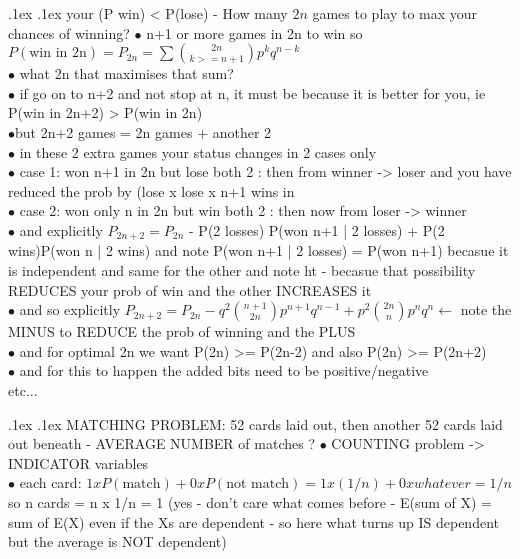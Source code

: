 \documentclass[10pt,landscape,a4paper]{article}
\makeatletter
\renewcommand{\section}{\@startsection{section}{1}{0mm}%
                                {.1ex}%
                                {.1ex}%
                                {\color{blue}\sffamily\small\bfseries}}
\makeatother
\begin{document}
\begin{multicols*}{3}
\begin{spacing}{0.1}
\section{your (P win) < P(lose) - How many $2n$ games to play to max your chances of winning? } 
$\bullet$ n+1 or more games in 2n to win so $ P(\text{win in 2n}) = P_{2n}=\sum \binom{2n}{k>= n+1} p^k q^{n-k}$\\
$\bullet$ what 2n that maximises that sum?\\
$\bullet$ if go on to n+2 and not stop at n, it must be because it is better for you, ie P(win in 2n+2) > P(win in 2n)\\
$\bullet$but 2n+2 games = 2n games + another 2\\
$\bullet$ in these 2 extra games your status changes in 2 cases only\\
$\bullet$ case 1: won n+1 in 2n but lose both 2 : then from winner ->  loser and you have reduced the prob by (lose x lose x n+1 wins in \\
$\bullet$ case 2: won only n in 2n but win both 2 : then now from loser -> winner\\
$\bullet$ and explicitly $P_{2n+2} = P_{2n} $ - P(2 losses) P(won n+1 | 2 losses) + P(2 wins)P(won n | 2 wins) and note P(won n+1 | 2 losses) = P(won n+1) becasue it is independent and same for the other and note ht - becasue that possibility REDUCES your prob of win and the other INCREASES it\\
$\bullet$ and so explicitly $P_{2n+2} = P_{2n} - q^2\binom{n+1}{2n}p^{n+1}q^{n-1} + p^2\binom{2n}{n}p^nq^n \longleftarrow$ note the MINUS to REDUCE the prob of winning and the PLUS \\
$\bullet$ and for optimal 2n we want P(2n) >= P(2n-2) and also P(2n) >= P(2n+2) \\
$\bullet$ and for this to happen the added bits need to be positive/negative\\
etc...

\section{MATCHING PROBLEM: 52 cards laid out, then another 52 cards laid out beneath - AVERAGE NUMBER of matches ?}
$\bullet$ COUNTING problem -> INDICATOR variables\\
$\bullet$ each card: $ 1 x P(\text{match}) + 0 x P(\text{not match}) = 1 x (1/n) + 0 x whatever = 1/n$ so n cards = n x 1/n = 1 (yes - don't care what comes before - E(sum of X) = sum of E(X) even if the Xs are dependent - so here what turns up IS dependent but the average is NOT dependent)


\end{spacing}
\end{multicols*}
\end{document}
